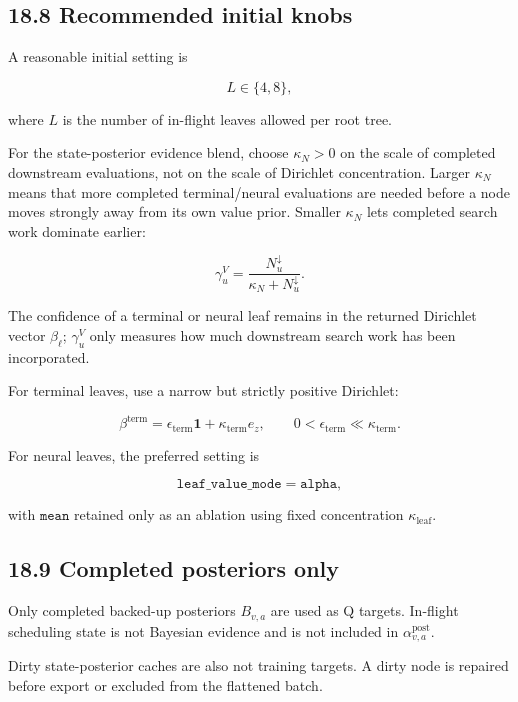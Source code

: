 \documentclass[11pt]{article}
\begin{document}
\subsection*{18.8 Recommended initial knobs}

A reasonable initial setting is

\[
L \in \{4,8\},
\]

where \(L\) is the number of in-flight leaves allowed per root tree.

For the state-posterior evidence blend, choose \(\kappa_N>0\) on the scale of
completed downstream evaluations, not on the scale of Dirichlet concentration.
Larger \(\kappa_N\) means that more completed terminal/neural evaluations are
needed before a node moves strongly away from its own value prior. Smaller
\(\kappa_N\) lets completed search work dominate earlier:

\[
\gamma^V_u=\frac{N^\downarrow_u}{\kappa_N+N^\downarrow_u}.
\]

The confidence of a terminal or neural leaf remains in the returned Dirichlet
vector \(\beta_\ell\); \(\gamma^V_u\) only measures how much downstream search work
has been incorporated.

For terminal leaves, use a narrow but strictly positive Dirichlet:

\[
\beta^{\mathrm{term}}=\epsilon_{\mathrm{term}}\mathbf{1}
+\kappa_{\mathrm{term}} e_z,
\qquad
0<\epsilon_{\mathrm{term}}\ll\kappa_{\mathrm{term}}.
\]

For neural leaves, the preferred setting is

\[
\texttt{leaf\_value\_mode}=\texttt{alpha},
\]

with \(\texttt{mean}\) retained only as an ablation using fixed concentration
\(\kappa_{\mathrm{leaf}}\).

\subsection*{18.9 Completed posteriors only}

Only completed backed-up posteriors \(B_{v,a}\) are used as Q targets. In-flight
scheduling state is not Bayesian evidence and is not included in
\(\alpha^{\mathrm{post}}_{v,a}\).

Dirty state-posterior caches are also not training targets. A dirty node is
repaired before export or excluded from the flattened batch.
\end{document}
